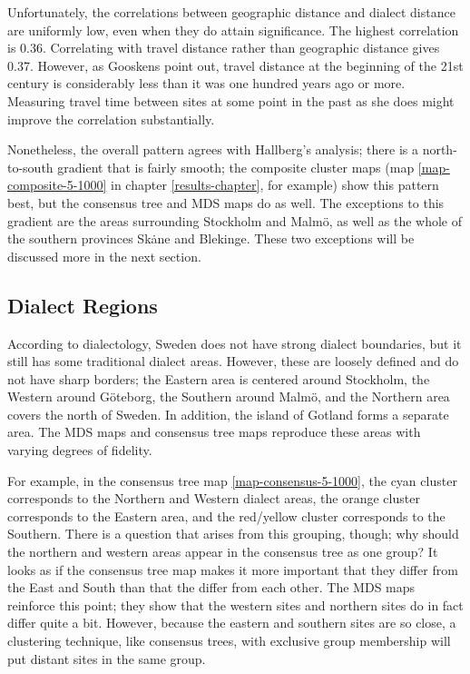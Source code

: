 Unfortunately, the correlations between geographic distance and dialect
distance are uniformly low, even when they do attain significance. The
highest correlation is 0.36. Correlating with travel distance rather
than geographic distance gives 0.37. However, as Gooskens point out, travel
distance at the beginning of the 21st century is considerably less
than it was one hundred years ago or more. Measuring travel time
between sites at some point in the past as she does might improve the
correlation substantially.

Nonetheless, the overall pattern agrees with Hallberg's analysis;
there is a north-to-south gradient that is fairly smooth; the
composite cluster maps (map \ref{map-composite-5-1000} in chapter
\ref{results-chapter}, for example) show this pattern best, but the
consensus tree and MDS maps do as well. The exceptions to this
gradient are the areas surrounding Stockholm and Malm\"o, as well as
the whole of the southern provinces Sk\.ane and Blekinge. These two
exceptions will be discussed more in the next section.

\subsection{Dialect Regions}

According to dialectology, Sweden does not have strong dialect
boundaries, but it still has some traditional dialect areas. However,
these are loosely defined and do not have sharp borders; the Eastern
area is centered around Stockholm, the Western around G\"oteborg, the
Southern around Malm\"o, and the Northern area covers the north of
Sweden. In addition, the island of Gotland forms a separate area. The
MDS maps and consensus tree maps reproduce these areas with varying
degrees of fidelity.

For example, in the consensus tree map \ref{map-consensus-5-1000}, the
cyan cluster corresponds to the Northern and Western dialect areas,
the orange cluster corresponds to the Eastern area, and the red/yellow
cluster corresponds to the Southern. There is a question that arises
from this grouping, though; why should the northern and western areas
appear in the consensus tree as one group? It looks as if the
consensus tree map makes it more important that they differ from the
East and South than that the differ from each other. The MDS maps
reinforce this point; they show that the western sites and northern sites
do in fact differ quite a bit. However, because the eastern and
southern sites are so close, a clustering technique, like consensus
trees, with exclusive group membership will put distant sites in the
same group.

